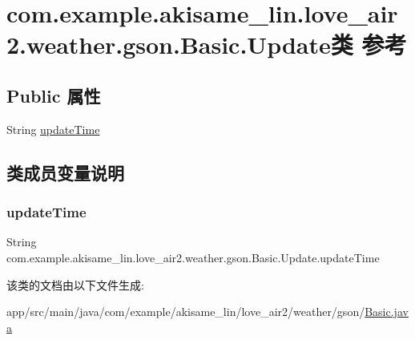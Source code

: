 \hypertarget{classcom_1_1example_1_1akisame__lin_1_1love__air2_1_1weather_1_1gson_1_1_basic_1_1_update}{}\section{com.\+example.\+akisame\+\_\+lin.\+love\+\_\+air2.\+weather.\+gson.\+Basic.\+Update类 参考}
\label{classcom_1_1example_1_1akisame__lin_1_1love__air2_1_1weather_1_1gson_1_1_basic_1_1_update}
\subsection*{Public 属性}
\begin{DoxyCompactItemize}
\item 
String \mbox{\hyperlink{classcom_1_1example_1_1akisame__lin_1_1love__air2_1_1weather_1_1gson_1_1_basic_1_1_update_a098e5b09191dbb4f41f43b8a823dcf21}{update\+Time}}
\end{DoxyCompactItemize}


\subsection{类成员变量说明}
\mbox{\label{classcom_1_1example_1_1akisame__lin_1_1love__air2_1_1weather_1_1gson_1_1_basic_1_1_update_a098e5b09191dbb4f41f43b8a823dcf21}} 
\subsubsection{\texorpdfstring{updateTime}{updateTime}}
{\footnotesize\ttfamily String com.\+example.\+akisame\+\_\+lin.\+love\+\_\+air2.\+weather.\+gson.\+Basic.\+Update.\+update\+Time}



该类的文档由以下文件生成\+:\begin{DoxyCompactItemize}
\item 
app/src/main/java/com/example/akisame\+\_\+lin/love\+\_\+air2/weather/gson/\mbox{\hyperlink{java_2com_2example_2akisame__lin_2love__air2_2weather_2gson_2_basic_8java}{Basic.\+java}}\end{DoxyCompactItemize}
